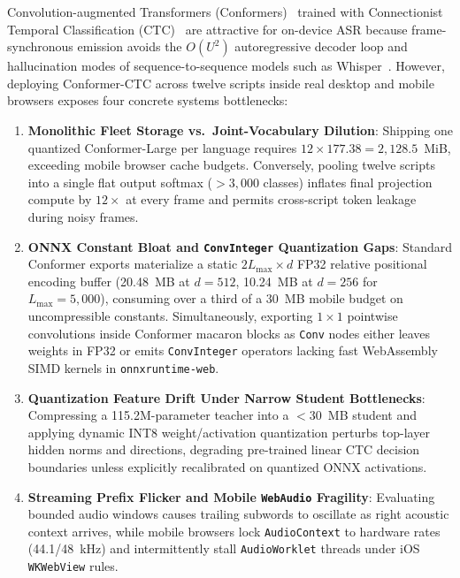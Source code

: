 \documentclass[10pt,twocolumn]{article}
\begin{document}
Convolution-augmented Transformers (Conformers)~\cite{gulati2020conformer} trained with Connectionist Temporal Classification (CTC)~\cite{graves2006ctc} are attractive for on-device ASR because frame-synchronous emission avoids the $O(U^2)$ autoregressive decoder loop and hallucination modes of sequence-to-sequence models such as Whisper~\cite{radford2023whisper}. However, deploying Conformer-CTC across twelve scripts inside real desktop and mobile browsers exposes four concrete systems bottlenecks:
\begin{enumerate}\setlength{\itemsep}{1pt}\setlength{\parskip}{0pt}
    \item \textbf{Monolithic Fleet Storage vs.\ Joint-Vocabulary Dilution}: Shipping one quantized Conformer-Large per language requires $12 \times 177.38 = 2{,}128.5$~MiB, exceeding mobile browser cache budgets. Conversely, pooling twelve scripts into a single flat output softmax ($> 3{,}000$ classes) inflates final projection compute by $12\times$ at every frame and permits cross-script token leakage during noisy frames.
    \item \textbf{ONNX Constant Bloat and \texttt{ConvInteger} Quantization Gaps}: Standard Conformer exports materialize a static $2 L_{\max} \times d$ FP32 relative positional encoding buffer (20.48~MB at $d = 512$, 10.24~MB at $d = 256$ for $L_{\max} = 5{,}000$), consuming over a third of a 30~MB mobile budget on uncompressible constants. Simultaneously, exporting $1\times 1$ pointwise convolutions inside Conformer macaron blocks as \texttt{Conv} nodes either leaves weights in FP32 or emits \texttt{ConvInteger} operators lacking fast WebAssembly SIMD kernels in \texttt{onnxruntime-web}.
    \item \textbf{Quantization Feature Drift Under Narrow Student Bottlenecks}: Compressing a 115.2M-parameter teacher into a $< 30$~MB student and applying dynamic INT8 weight/activation quantization perturbs top-layer hidden norms and directions, degrading pre-trained linear CTC decision boundaries unless explicitly recalibrated on quantized ONNX activations.
    \item \textbf{Streaming Prefix Flicker and Mobile \texttt{WebAudio} Fragility}: Evaluating bounded audio windows causes trailing subwords to oscillate as right acoustic context arrives, while mobile browsers lock \texttt{AudioContext} to hardware rates (44.1/48~kHz) and intermittently stall \texttt{AudioWorklet} threads under iOS \texttt{WKWebView} rules.
\end{enumerate}
\end{document}

